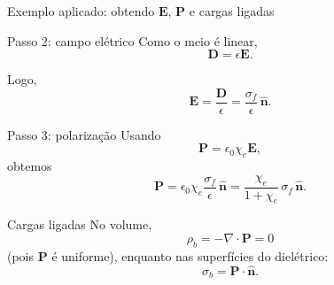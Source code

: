 \documentclass[aspectratio=169]{beamer}
\begin{document}

\begin{frame}{Exemplo aplicado: obtendo \(\mathbf{E}\), \(\mathbf{P}\) e cargas ligadas}

\begin{block}{Passo 2: campo elétrico}
Como o meio é linear,
\begin{equation}
\mathbf{D}=\epsilon \mathbf{E}.
\end{equation}

Logo,
\begin{equation}
\mathbf{E}=\frac{\mathbf{D}}{\epsilon}
=\frac{\sigma_f}{\epsilon}\,\hat{\mathbf{n}}.
\end{equation}
\end{block}

\pause

\begin{block}{Passo 3: polarização}
Usando
\begin{equation}
\mathbf{P}=\epsilon_0\chi_e \mathbf{E},
\end{equation}
obtemos
\begin{equation}
\mathbf{P}
=
\epsilon_0\chi_e\frac{\sigma_f}{\epsilon}\,\hat{\mathbf{n}}
=
\frac{\chi_e}{1+\chi_e}\,\sigma_f\,\hat{\mathbf{n}}.
\end{equation}
\end{block}


\end{frame}


\begin{frame}

\begin{alertblock}{Cargas ligadas}
No volume,
\begin{equation}
\rho_b=-\nabla\cdot \mathbf{P}=0
\end{equation}
(pois \(\mathbf{P}\) é uniforme), enquanto nas superfícies do dielétrico:
\begin{equation}
\sigma_b=\mathbf{P}\cdot \hat{\mathbf{n}}.
\end{equation}
\end{alertblock}

\end{frame}

\end{document}
